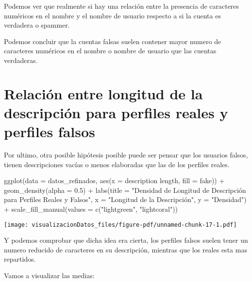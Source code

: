 \documentclass[
  letterpaper,
  DIV=11,
  numbers=noendperiod]{scrreprt}
\newenvironment{Shaded}{\begin{snugshade}}{\end{snugshade}}
\newcommand{\AttributeTok}[1]{\textcolor[rgb]{0.40,0.45,0.13}{#1}}
\newcommand{\FloatTok}[1]{\textcolor[rgb]{0.68,0.00,0.00}{#1}}
\newcommand{\FunctionTok}[1]{\textcolor[rgb]{0.28,0.35,0.67}{#1}}
\newcommand{\NormalTok}[1]{\textcolor[rgb]{0.00,0.23,0.31}{#1}}
\newcommand{\SpecialCharTok}[1]{\textcolor[rgb]{0.37,0.37,0.37}{#1}}
\newcommand{\StringTok}[1]{\textcolor[rgb]{0.13,0.47,0.30}{#1}}
\begin{document}
Podemos ver que realmente si hay una relación entre la presencia de
caracteres numéricos en el nombre y el nombre de usuario respecto a si
la cuenta es verdadera o spammer.

Podemos concluir que la cuentas falsas suelen contener mayor numero de
caracteres numéricos en el nombre o nombre de usuario que las cuentas
verdaderas.

\section{Relación entre longitud de la descripción para perfiles reales
y perfiles
falsos}\label{relaciuxf3n-entre-longitud-de-la-descripciuxf3n-para-perfiles-reales-y-perfiles-falsos}

Por ultimo, otra posible hipótesis posible puede ser pensar que los
usuarios falsos, tienen descripciones vacías o menos elaboradas que las
de los perfiles reales.

\begin{Shaded}
\begin{Highlighting}[]
\FunctionTok{ggplot}\NormalTok{(}\AttributeTok{data =}\NormalTok{ datos\_refinados, }\FunctionTok{aes}\NormalTok{(}\AttributeTok{x =} \StringTok{\textasciigrave{}}\AttributeTok{description length}\StringTok{\textasciigrave{}}\NormalTok{, }\AttributeTok{fill =}\NormalTok{ fake)) }\SpecialCharTok{+}
  \FunctionTok{geom\_density}\NormalTok{(}\AttributeTok{alpha =} \FloatTok{0.5}\NormalTok{) }\SpecialCharTok{+}
  \FunctionTok{labs}\NormalTok{(}\AttributeTok{title =} \StringTok{"Densidad de Longitud de Descripción para Perfiles Reales y Falsos"}\NormalTok{,}
       \AttributeTok{x =} \StringTok{"Longitud de la Descripción"}\NormalTok{,}
       \AttributeTok{y =} \StringTok{"Densidad"}\NormalTok{) }\SpecialCharTok{+}
  \FunctionTok{scale\_fill\_manual}\NormalTok{(}\AttributeTok{values =} \FunctionTok{c}\NormalTok{(}\StringTok{"lightgreen"}\NormalTok{, }\StringTok{"lightcoral"}\NormalTok{))}
\end{Highlighting}
\end{Shaded}

\texttt{[image: visualizacionDatos\_files/figure-pdf/unnamed-chunk-17-1.pdf]}

Y podemos comprobar que dicha idea era cierta, los perfiles falsos
suelen tener un numero reducido de caracteres en su descripción,
mientras que los reales esta mas repartidos.

Vamos a visualizar las medias:
\end{document}
